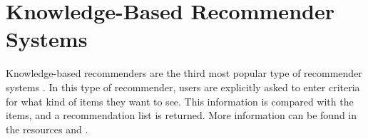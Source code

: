 
\section{Knowledge-Based Recommender Systems}\label{chapter:knowledge_based}

Knowledge-based recommenders are the third most popular type of recommender systems \cite{burke2000knowledge}. In this type of recommender, users are explicitly asked to enter criteria for what kind of items they want to see. This information is compared with the items, and a recommendation list is returned. More information can be found in the resources \cite{burke2000knowledge} and \cite{felfernig2015constraint}.


